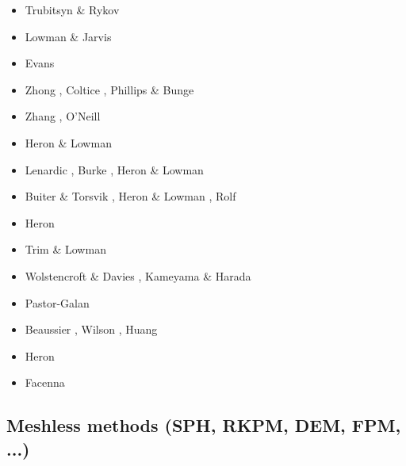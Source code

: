 \begin{scriptsize}
\begin{itemize}
\item[\nineteenninetyfive] Trubitsyn \& Rykov \cite{trry95}
\item[\nineteenninetynine] Lowman \& Jarvis \cite{loja99}
\item[\twothousandthree] Evans \cite{evan03}
\item[\twothousandseven] Zhong \etal \cite{zhzl07}, Coltice \etal \cite{copb07}, 
                         Phillips \& Bunge \cite{phbu07}
\item[\twothousandnine] Zhang \etal \cite{zhzm09}, O'Neill \etal \cite{onlj09}
\item[\twothousandten] Heron \& Lowman \cite{helo10}
\item[\twothousandeleven] Lenardic \etal \cite{lemj11}, Burke \cite{burk11}, Heron \& Lowman \cite{helo11}
\item[\twothousandfourteen] Buiter \& Torsvik \cite{buto14}, Heron \& Lowman \cite{helo14}, 
                            Rolf \etal \cite{roct14}
\item[\twothousandfifteen] Heron \etal \cite{hels15}
\item[\twothousandsixteen] Trim \& Lowman \cite{trlo16}
\item[\twothousandseventeen] Wolstencroft \& Davies \cite{woda17}, Kameyama \& Harada \cite{kaha17}
\item[\twothousandeighteen] Pastor-Galan \etal \cite{panm18}
\item[\twothousandnineteen] Beaussier \etal \cite{begb19}, Wilson \etal \cite{wihb19}, 
                            Huang \etal \cite{huzl19} 
\item[\twothousandtwenty] Heron \etal \cite{hemn20}
\item[\twothousandtwentyone] Facenna \etal \cite{fabh21}
\end{itemize}
\end{scriptsize}

\subsection{Meshless methods (SPH, RKPM, DEM, FPM, ...)}

